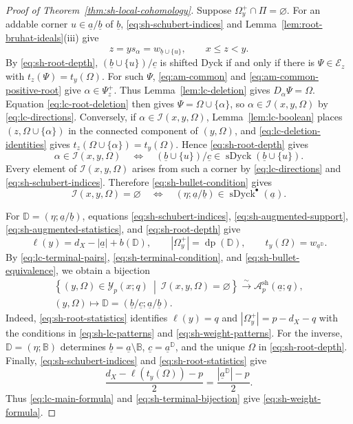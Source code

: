 \documentclass[12pt]{amsart}
\renewcommand{\a}{\underline{a}}
\renewcommand{\b}{\underline{b}}
\newcommand{\DD}{\mathbb{D}}
\theoremstyle{definition}
\numberwithin{equation}{section}
\begin{document}
\begin{proof}[Proof of Theorem~\ref{thm:sh-local-cohomology}]
Suppose $\Omega_y^+\cap\Pi=\varnothing$.
For an addable corner $u\in\a/\b$ of $\b$,
\eqref{eq:sh-schubert-indices} and
Lemma~\ref{lem:root-bruhat-ideals}\textup{(iii)} give
\[
z=ys_\alpha=w_{\b\cup\{u\}},\qquad x\leq z<y.
\]
By \eqref{eq:sh-root-depth},
$(\b\cup\{u\})/\underline c$ is shifted Dyck if and only if
there is $\Psi\in\mathscr E_z$ with $t_z(\Psi)=t_y(\Omega)$.
For such $\Psi$, \eqref{eq:am-common} and
\eqref{eq:am-common-positive-root} give $\alpha\in\Psi_z^+$.
Thus Lemma~\ref{lem:lc-deletion} gives $D_\alpha\Psi=\Omega$.
Equation \eqref{eq:lc-root-deletion} then gives
$\Psi=\Omega\cup\{\alpha\}$, so
$\alpha\in\mathscr I(x,y,\Omega)$ by \eqref{eq:lc-directions}.
Conversely, if $\alpha\in\mathscr I(x,y,\Omega)$,
Lemma~\ref{lem:lc-boolean} places
$(z,\Omega\cup\{\alpha\})$ in the connected component of
$(y,\Omega)$, and \eqref{eq:lc-deletion-identities} gives
$t_z(\Omega\cup\{\alpha\})=t_y(\Omega)$.
Hence \eqref{eq:sh-root-depth} gives
\[
\alpha\in\mathscr I(x,y,\Omega)
\quad\Longleftrightarrow\quad
(\b\cup\{u\})/\underline c\in
\operatorname{sDyck}(\b\cup\{u\}).
\]
Every element of $\mathscr I(x,y,\Omega)$ arises from such
a corner by \eqref{eq:lc-directions} and
\eqref{eq:sh-schubert-indices}.
Therefore \eqref{eq:sh-bullet-condition} gives
\begin{equation}\label{eq:sh-bullet-equivalence}
\mathscr I(x,y,\Omega)=\varnothing
\quad\Longleftrightarrow\quad
(\eta;\a/\b)\in\operatorname{sDyck}^{\bullet}(\a).
\end{equation}

For $\DD=(\eta;\a/\b)$, equations
\eqref{eq:sh-schubert-indices},
\eqref{eq:sh-augmented-support},
\eqref{eq:sh-augmented-statistics}, and
\eqref{eq:sh-root-depth} give
\begin{equation}\label{eq:sh-root-statistics}
\ell(y)=d_X-|\a|+b(\DD),\qquad
|\Omega_y^+|=\operatorname{dp}(\DD),\qquad
t_y(\Omega)=w_{\a^{\DD}}.
\end{equation}
By \eqref{eq:lc-terminal-pairs},
\eqref{eq:sh-terminal-condition}, and
\eqref{eq:sh-bullet-equivalence}, we obtain a bijection
\begin{equation}\label{eq:sh-terminal-bijection}
\begin{gathered}
\left\{(y,\Omega)\in\mathscr Y_p(x;q)\ \middle|\
\mathscr I(x,y,\Omega)=\varnothing\right\}
\xrightarrow{\sim}\mathscr A^{\mathrm{sh}}_p(\a;q),\\
(y,\Omega)\longmapsto\DD=(\b/\underline c;\a/\b).
\end{gathered}
\end{equation}
Indeed, \eqref{eq:sh-root-statistics} identifies
$\ell(y)=q$ and $|\Omega_y^+|=p-d_X-q$ with the conditions
in \eqref{eq:sh-lc-patterns} and \eqref{eq:sh-weight-patterns}.
For the inverse, $\DD=(\eta;\mathbb B)$ determines
$\b=\a\setminus\mathbb B$, $\underline c=\a^{\DD}$,
and the unique $\Omega$ in \eqref{eq:sh-root-depth}.
Finally, \eqref{eq:sh-schubert-indices} and
\eqref{eq:sh-root-statistics} give
\[
\frac{d_X-\ell(t_y(\Omega))-p}{2}
=\frac{|\a^{\DD}|-p}{2}.
\]
Thus \eqref{eq:lc-main-formula} and
\eqref{eq:sh-terminal-bijection} give \eqref{eq:sh-weight-formula}.
\end{proof}
\end{document}
